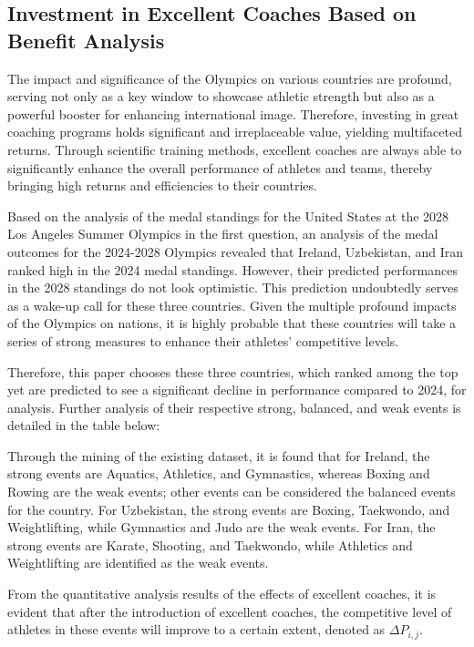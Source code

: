 \documentclass{mcmthesis}
\begin{document}
\subsection{Investment in Excellent Coaches Based on Benefit Analysis}
The impact and significance of the Olympics on various countries are profound, serving not only as a key window to showcase athletic strength but also as a powerful booster for enhancing international image. Therefore, investing in great coaching programs holds significant and irreplaceable value, yielding multifaceted returns. Through scientific training methods, excellent coaches are always able to significantly enhance the overall performance of athletes and teams, thereby bringing high returns and efficiencies to their countries.

Based on the analysis of the medal standings for the United States at the 2028 Los Angeles Summer Olympics in the first question, an analysis of the medal outcomes for the 2024-2028 Olympics revealed that Ireland, Uzbekistan, and Iran ranked high in the 2024 medal standings. However, their predicted performances in the 2028 standings do not look optimistic. This prediction undoubtedly serves as a wake-up call for these three countries. Given the multiple profound impacts of the Olympics on nations, it is highly probable that these countries will take a series of strong measures to enhance their athletes' competitive levels.

Therefore, this paper chooses these three countries, which ranked among the top yet are predicted to see a significant decline in performance compared to 2024, for analysis. Further analysis of their respective strong, balanced, and weak events is detailed in the table below:

Through the mining of the existing dataset, it is found that for Ireland, the strong events are Aquatics, Athletics, and Gymnastics, whereas Boxing and Rowing are the weak events; other events can be considered the balanced events for the country. For Uzbekistan, the strong events are Boxing, Taekwondo, and Weightlifting, while Gymnastics and Judo are the weak events. For Iran, the strong events are Karate, Shooting, and Taekwondo, while Athletics and Weightlifting are identified as the weak events.

From the quantitative analysis results of the effects of excellent coaches, it is evident that after the introduction of excellent coaches, the competitive level of athletes in these events will improve to a certain extent, denoted as $\Delta P_{i, j}$.
\end{document}
